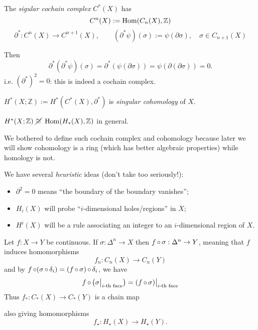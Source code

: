 \documentclass[a4paper,11pt]{article}
\begin{document}
	\begin{defi}
		The \emph{sigular cochain complex} $C^*(X)$ has
		\[
			C^n(X) := \operatorname{Hom}(C_n(X), \mathbb{Z})
		\]
		\[
			\partial^*: C^n (X) \to C^{n+1}(X), \qquad (\partial^* \psi)(\sigma) := \psi(\partial\sigma),\quad \sigma\in C_{n+1}(X)
		\]
		
		Then 
		\[
			\partial^* (\partial^* \psi)(\sigma) = \partial^*(\psi(\partial \sigma)) = \psi (\partial(\partial\sigma)) = 0.
		\]
		i.e. $(\partial^*)^2 = 0$: this is indeed a cochain complex. 
	\end{defi}

	\begin{nt}
		$H^*(X;\mathbb{Z}) := H^*(C^*(X),\partial^*)$ is \emph{singular cohomology} of $X$. 
		
		$H^*(X;\mathbb{Z})\ \cancel{\cong}\ \Hom(H_*(X),\mathbb{Z})$ in general.
		
		We bothered to define such cochain complex and cohomology because later we will show cohomology is a ring (which has better algebraic properties) while homology is not.
	\end{nt}
	
	\begin{nt}
		We have several \emph{heuristic} ideas (don't take too seriously!):
		\begin{itemize}
			\item $\partial^2 = 0$ means ``the boundary of the boundary vanishes'';
			\item $H_i(X)$ will probe ``$i$-dimensional holes/regions'' in $X$;
			\item $H^i (X)$ will be a rule associating an integer to an $i$-dimensional region of $X$.
		\end{itemize}
	\end{nt}


	\begin{rmk}
		Let $f : X \to Y$ be continuous. If $\sigma: \Delta^n \to X$ then $f \operatorname{\circ} \sigma : \Delta^n \to Y$, meaning that $f$ induces homomorphisms
		\[
			f_n : C_n (X) \to C_n(Y)
		\]
		and by $f\operatorname{\circ} (\sigma \operatorname{\circ} \delta_i) = (f \operatorname{\circ} \sigma) \operatorname{\circ} \delta_i$, we have
		\[
			f \operatorname{\circ} \left( \sigma\big|_{\text{$i$-th face}} \right) = (f \operatorname{\circ} \sigma)\big|_{\text{$i$-th face}}
		\]
		Thus $f_* : C_* (X) \to C_*(Y)$ is a chain map
		\begin{center}
		\end{center}
		also giving homomorphisms
		\[
			f_\star : H_{\star} (X) \to H_{\star}(Y).
		\]
	\end{rmk}
\end{document}

